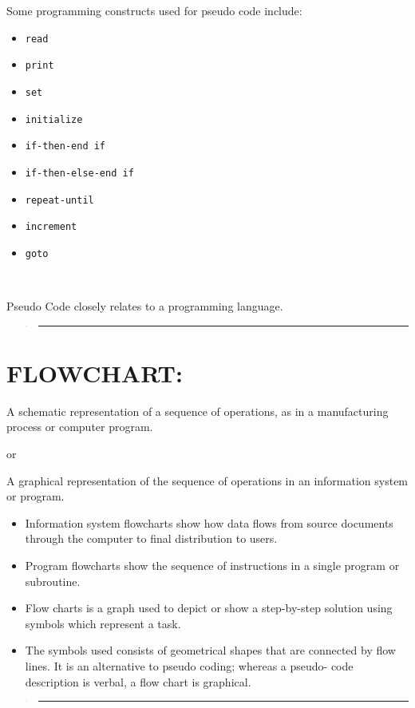 \documentclass[10pt,english]{article}
\begin{document}
Some programming constructs used for pseudo code include:

\noindent\begin{minipage}[t]{1\columnwidth}%
\begin{itemize}
\item \texttt{read}
\item \texttt{print}
\item \texttt{set}
\item \texttt{initialize}
\item \texttt{if-then-end if}
\item \texttt{if-then-else-end if}
\item \texttt{repeat-until}
\item \texttt{increment}
\item \texttt{goto}
\end{itemize}
%
\end{minipage}

\ 

Pseudo Code closely relates to a programming language. 
\begin{verse}
\rule[0.5ex]{1\columnwidth}{1pt}
\end{verse}

\section{FLOWCHART:}

A schematic representation of a sequence of operations, as in a manufacturing
process or computer program. 

or

A graphical representation of the sequence of operations in an information
system or program. 
\begin{itemize}
\item Information system flowcharts show how data flows from source documents
through the computer to final distribution to users. 
\item Program flowcharts show the sequence of instructions in a single program
or subroutine.
\item Flow charts is a graph used to depict or show a step-by-step solution
using symbols which represent a task. 
\item The symbols used consists of geometrical shapes that are connected
by flow lines. It is an alternative to pseudo coding; whereas a pseudo-
code description is verbal, a flow chart is graphical. 
\end{itemize}
\begin{verse}
\rule[0.5ex]{1\columnwidth}{1pt}
\end{verse}
\end{document}
